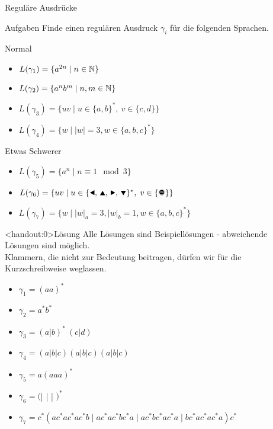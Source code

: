 {
\begin{frame}{Reguläre Ausdrücke}
    \begin{alertblock}{Aufgaben}
        Finde einen regulären Ausdruck $\gamma_i$ für die folgenden Sprachen.
    \end{alertblock}
    \begin{block}{Normal}
        \begin{itemize}
            \item $L(\gamma_1) = \{a^{2n} \mid n\in\mathbb{N}\}$
            \item $L(\gamma_2) = \{a^nb^m \mid n, m\in\mathbb{N}\}$
            \item $L(\gamma_3) = \{uv \mid u\in\{a,b\}^\ast,\ v\in\{c,d\}\}$
            \item $L(\gamma_4) = \{w \mid |w| = 3, w\in \{a,b,c\}^*\}$
        \end{itemize}
    \end{block}
    \begin{block}{Etwas Schwerer}
        \begin{itemize}
            \item $L(\gamma_5) = \{a^n \mid n \equiv 1 \mod 3\}$
            \item $L(\gamma_6) = \{uv\mid u\in\{\text{\Rewind, \MoveUp, \Forward, \MoveDown}\}^\ast,\;v\in\{\text{\Stopsign}\}\}$
            \item $L(\gamma_7) = \{w \mid |w|_a = 3, |w|_b = 1, w\in \{a,b,c\}^*\}$
        \end{itemize}
    \end{block}
\end{frame}
}

{
\begin{frame}<handout:0>{Lösung}
    Alle Lösungen sind Beispiellösungen - abweichende Lösungen sind möglich.\\
    Klammern, die nicht zur Bedeutung beitragen, dürfen wir für die Kurzschreibweise weglassen.
    \begin{itemize}[<+- | alert@+>]
        \item $\gamma_1 = (aa)^*$
        \item $\gamma_2 = a^*b^*$
        \item $\gamma_3 = (a|b)^*\ (c|d)$
        \item $\gamma_4 = (a|b|c)(a|b|c)(a|b|c)$
        \item $\gamma_5 = a(aaa)^*$
        \item $\gamma_6 = ($\Rewind | \MoveUp | \Forward | \MoveDown$)^*$\Stopsign
        \item $\gamma_7 = c^*(ac^*ac^*ac^*b\mid ac^*ac^*bc^*a\mid ac^*bc^*ac^*a\mid bc^*ac^*ac^*a)c^*$
    \end{itemize}
\end{frame}
}


